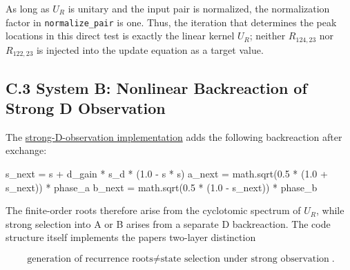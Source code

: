 \documentclass[
  a4paper,
  10pt]{article}
\newenvironment{Shaded}{}{}
\newcommand{\FloatTok}[1]{\textcolor[rgb]{0.25,0.63,0.44}{#1}}
\newcommand{\NormalTok}[1]{#1}
\newcommand{\OperatorTok}[1]{\textcolor[rgb]{0.40,0.40,0.40}{#1}}
\begin{document}
As long as \(U_R\) is unitary and the input pair is normalized, the
normalization factor in \texttt{normalize\_pair} is one. Thus, the
iteration that determines the peak locations in this direct test is
exactly the linear kernel \(U_R\); neither \(R_{124,23}\) nor
\(R_{122,23}\) is injected into the update equation as a target value.

\subsection{C.3 System B: Nonlinear Backreaction of Strong D
Observation}\label{c3-system-b-nonlinear-backreaction-of-strong-d-observation}

The
\href{../20260714/run_gray_cat_d_observation_response_preliminary_v1.py}{strong-D-observation
implementation} adds the following backreaction after exchange:

\begin{Shaded}
\begin{Highlighting}[]
\NormalTok{s\_next }\OperatorTok{=}\NormalTok{ s }\OperatorTok{+}\NormalTok{ d\_gain }\OperatorTok{*}\NormalTok{ s\_d }\OperatorTok{*}\NormalTok{ (}\FloatTok{1.0} \OperatorTok{{-}}\NormalTok{ s }\OperatorTok{*}\NormalTok{ s)}
\NormalTok{a\_next }\OperatorTok{=}\NormalTok{ math.sqrt(}\FloatTok{0.5} \OperatorTok{*}\NormalTok{ (}\FloatTok{1.0} \OperatorTok{+}\NormalTok{ s\_next)) }\OperatorTok{*}\NormalTok{ phase\_a}
\NormalTok{b\_next }\OperatorTok{=}\NormalTok{ math.sqrt(}\FloatTok{0.5} \OperatorTok{*}\NormalTok{ (}\FloatTok{1.0} \OperatorTok{{-}}\NormalTok{ s\_next)) }\OperatorTok{*}\NormalTok{ phase\_b}
\end{Highlighting}
\end{Shaded}

The finite-order roots therefore arise from the cyclotomic spectrum of
\(U_R\), while strong selection into A or B arises from a separate D
backreaction. The code structure itself implements the
paper\textquotesingle s two-layer distinction

\[
\boxed{
\text{generation of recurrence roots}
\ne
\text{state selection under strong observation}
}.
\]
\end{document}
